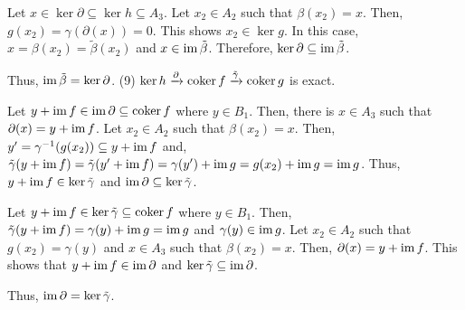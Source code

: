 Let \(x \in \ker\partial \subseteq \ker h \subseteq A_3\).
Let \(x_2 \in A_2\) such that \(\beta(x_2) = x\).
Then, \(g(x_2) = \gamma(\partial(x)) = 0\).
This shows \(x_2 \in \ker g\).
In this case, \(x = \beta(x_2) = \tilde\beta(x_2)\)
and \(x \in \textnormal{im}\,\tilde\beta\).
Therefore, \(\ker\partial \subseteq \textnormal{im}\,\tilde\beta\).

Thus, \(\textnormal{im}\,\tilde\beta = \ker\partial\).
\br
\noindent
(9) \(\ker h \xrightarrow{\partial} \textnormal{coker}\, f \xrightarrow{\tilde\gamma} \textnormal{coker}\, g\) is exact.

Let \(y + \textnormal{im}\, f \in \textnormal{im}\,\partial \subseteq \textnormal{coker}\, f\) where \(y \in B_1\).
Then, there is \(x \in A_3\) such that \(\partial(x) = y + \textnormal{im}\, f\).
Let \(x_2 \in A_2\) such that \(\beta(x_2) = x\). 
Then, \(y' = \gamma^{-1}(g(x_2)) \subseteq y + \textnormal{im}\, f\) and,
\(\tilde\gamma(y + \textnormal{im}\, f) = \tilde\gamma(y' + \textnormal{im}\, f) = \gamma(y') + \textnormal{im}\, g = g(x_2) + \textnormal{im}\, g = \textnormal{im}\, g\).
Thus, \(y + \textnormal{im}\, f \in \ker\tilde\gamma\) and
\(\textnormal{im}\,\partial \subseteq \ker\tilde\gamma\).

Let \(y + \textnormal{im}\, f \in \ker\tilde\gamma \subseteq \textnormal{coker}\, f\) where \(y \in B_1\).
Then, \(\tilde\gamma(y + \textnormal{im}\, f) = \gamma(y) + \textnormal{im}\, g = \textnormal{im}\, g\) and \(\gamma(y) \in \textnormal{im}\, g\).
Let \(x_2 \in A_2\) such that \(g(x_2) = \gamma(y)\) and \(x \in A_3\) such that \(\beta(x_2) =  x\).
Then, \(\partial(x) = y + \textnormal{im}\, f\).
This shows that \(y + \textnormal{im}\, f \in \textnormal{im}\,\partial\) and
\(\ker\tilde\gamma \subseteq \textnormal{im}\,\partial\).

Thus, \(\textnormal{im}\,\partial = \ker\tilde\gamma\).
\qedsq